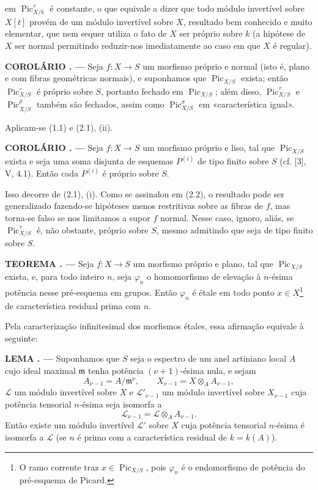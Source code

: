 \documentclass[11pt,twoside,openany]{book}
\numberwithin{equation}{section}
\newcommand{\src}[1]{%
  \phantomsection\hypertarget{src:#1}{}%
  \marginpar{\raggedleft\footnotesize\sffamily #1}%
}
\theoremstyle{plain}
\theoremstyle{definition}
\theoremstyle{remark}
\newcommand{\result}[2]{%
  \par\medskip\noindent\textbf{#1%
  \if\relax\detokenize{#2}\relax\else\space#2\fi. ---}\enspace
}
\newcommand{\FgaUnitKey}{frontmatter}
\renewcommand{\src}[1]{%
  \phantomsection\hypertarget{src:\FgaUnitKey:#1}{}%
  \marginpar{\raggedleft\footnotesize\sffamily #1}%
}
\begin{document}
em $\operatorname{Pic}_{X/k}^\tau$ é constante, o que equivale a dizer que todo
módulo invertível sobre $X[t]$ provém de um módulo invertível sobre $X$, resultado bem conhecido e
muito elementar, que nem sequer utiliza o fato de $X$ ser próprio sobre $k$ (a
hipótese de $X$ ser normal permitindo reduzir-nos imediatamente ao caso em que
$X$ é regular).

\result{COROLÁRIO}{2.3} Seja $f:X\longrightarrow S$ um morfismo próprio e
normal (isto é, plano e com fibras geométricas normais), e suponhamos que
$\operatorname{Pic}_{X/S}$ exista; então $\operatorname{Pic}_{X/S}^\circ$ é
próprio sobre $S$, portanto fechado em $\operatorname{Pic}_{X/S}$; além disso,
$\operatorname{Pic}_{X/S}^\tau$ e $\operatorname{Pic}_{X/S}^\rho$ também são
fechados, assim como $\operatorname{Pic}_{X/S}^\sigma$ em «característica
igual».

Aplicam-se (1.1) e (2.1), (ii).

\result{COROLÁRIO}{2.4} Seja $f:X\longrightarrow S$ um morfismo próprio e liso,
tal que $\operatorname{Pic}_{X/S}$ exista e seja uma soma disjunta de esquemas
$P^{(i)}$ de tipo finito sobre $S$ (cf. [3], V, 4.1). Então cada $P^{(i)}$ é
próprio sobre $S$.

Isso decorre de (2.1), (i). Como se assinalou em (2.2), o resultado pode ser
generalizado fazendo-se hipóteses menos restritivas sobre as fibras de $f$, mas
torna-se falso se nos limitamos a supor $f$ normal. Nesse caso, ignoro, aliás,
se $\operatorname{Pic}_{X/S}^\tau$ é, não obstante, próprio sobre $S$, mesmo
admitindo que seja de tipo finito sobre $S$.
\src{233}
\result{TEOREMA}{2.5} Seja $f:X\longrightarrow S$ um morfismo próprio e plano,
tal que $\operatorname{Pic}_{X/S}$ exista, e, para todo inteiro $n$, seja
$\varphi_n$ o homomorfismo de elevação à $n$-ésima potência nesse pré-esquema
em grupos. Então $\varphi_n$ é étale em todo ponto
$x\in X$\footnote{O ramo corrente traz $x\in\operatorname{Pic}_{X/S}$, pois
$\varphi_n$ é o endomorfismo de potência do pré-esquema de Picard.} de
característica residual prima com $n$.

Pela caracterização infinitesimal dos morfismos étales, essa afirmação equivale
à seguinte:

\result{LEMA}{2.6} Suponhamos que $S$ seja o espectro de um anel artiniano local
$A$ cujo ideal maximal $\mathfrak m$ tenha potência $(\nu+1)$-ésima nula, e
sejam
\[
A_{\nu-1}=A/\mathfrak m^\nu,
\qquad X_{\nu-1}=X\otimes_A A_{\nu-1},
\]
$\mathcal L$ um módulo invertível sobre $X$ e $\mathcal L'_{\nu-1}$ um módulo
invertível sobre $X_{\nu-1}$ cuja potência tensorial $n$-ésima seja isomorfa a
\[
\mathcal L_{\nu-1}=\mathcal L\otimes_A A_{\nu-1}.
\]
Então existe um módulo invertível $\mathcal L'$ sobre $X$ cuja potência
tensorial $n$-ésima é isomorfa a $\mathcal L$ (se $n$ é primo com a
característica residual de $k=k(A)$).
\end{document}
